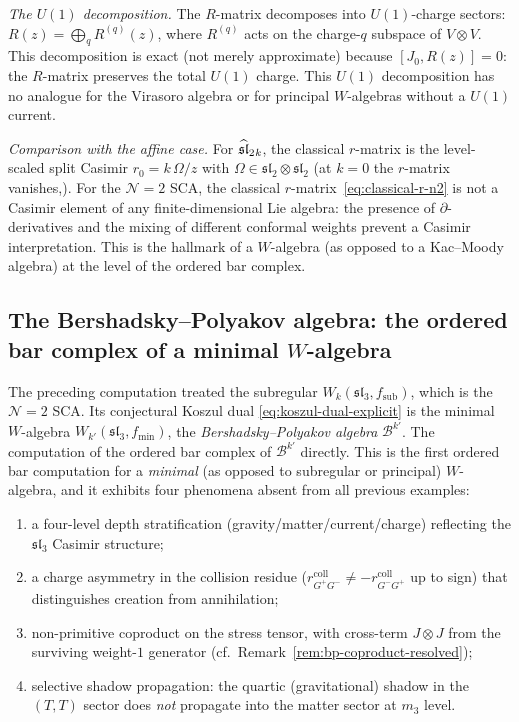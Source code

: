 \begin{computation}
\emph{The $U(1)$ decomposition.}
The $R$-matrix decomposes into $U(1)$-charge sectors:
$R(z) = \bigoplus_{q} R^{(q)}(z)$, where $R^{(q)}$ acts on
the charge-$q$ subspace of $V\otimes V$. This decomposition
is exact (not merely approximate) because $[J_0, R(z)] = 0$:
the $R$-matrix preserves the total $U(1)$ charge. This
$U(1)$ decomposition has no analogue for the Virasoro algebra
or for principal $W$-algebras without a $U(1)$ current.

\emph{Comparison with the affine case.}
For $\wsl_2{}_k$, the classical $r$-matrix is the
level-scaled split Casimir $r_0 = k\,\Omega/z$ with
$\Omega\in\mathfrak{sl}_2\otimes\mathfrak{sl}_2$
(at $k=0$ the $r$-matrix vanishes,). For the $\mathcal N=2$ SCA, the
classical $r$-matrix~\eqref{eq:classical-r-n2} is not a
Casimir element of any finite-dimensional Lie algebra:
the presence of $\partial$-derivatives and the mixing of
different conformal weights prevent a Casimir
interpretation. This is the hallmark of a $W$-algebra
(as opposed to a Kac--Moody algebra) at the level of
the ordered bar complex.
\end{computation}

\subsection{The Bershadsky--Polyakov algebra:
the ordered bar complex of a minimal $W$-algebra}
\label{subsec:ordered-bar-bp}

\providecommand{\Gp}{G^+}
\providecommand{\Gm}{G^-}
\providecommand{\wsl}{\widehat{\mathfrak{sl}}}

The preceding computation treated the subregular
$W_k(\mathfrak{sl}_3,f_{\mathrm{sub}})$, which is the
$\mathcal N=2$ SCA\@. Its conjectural Koszul dual
\eqref{eq:koszul-dual-explicit} is the minimal $W$-algebra
$W_{k'}(\mathfrak{sl}_3,f_{\min})$, the
\emph{Bershadsky--Polyakov algebra} $\mathcal{B}^{k'}$.
The computation of the ordered bar complex of $\mathcal{B}^{k'}$
directly. This is the first ordered bar computation for a
\emph{minimal} (as opposed to subregular or principal)
$W$-algebra, and it exhibits four phenomena absent from all
previous examples:
\begin{enumerate}[label=(\roman*)]
\item a four-level depth stratification
(gravity/matter/current/charge) reflecting the
$\mathfrak{sl}_3$ Casimir structure;
\item a charge asymmetry in the collision residue
($r^{\mathrm{coll}}_{\Gp\Gm}\neq -r^{\mathrm{coll}}_{\Gm\Gp}$
up to sign) that distinguishes creation from annihilation;
\item non-primitive coproduct on the stress tensor, with
cross-term $J\otimes J$ from the surviving weight-$1$
generator (cf.\ Remark~\ref{rem:bp-coproduct-resolved});
\item selective shadow propagation: the quartic (gravitational)
shadow in the $(T,T)$ sector does \emph{not} propagate into
the matter sector at $m_3$ level.
\end{enumerate}


